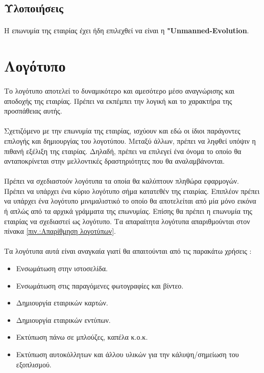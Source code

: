 \documentclass[a4paper, 12pt, twoside]{report}
\begin{document}
			
		\subsection{Υλοποιήσεις}
			\paragraph{}{Η επωνυμία της εταιρίας έχει ήδη επιλεχθεί να είναι η \textbf{"Unmanned-Evolution}.
			}
			
		
		\section{Λογότυπο}
			\paragraph{}{Το λογότυπο αποτελεί το δυναμικότερο και αμεσότερο μέσο αναγνώρισης και αποδοχής της εταιρίας. Πρέπει να εκπέμπει την λογική και το χαρακτήρα της προσπάθειας αυτής.
			}
			\paragraph{}{Σχετιζόμενο με την επωνυμία της εταιρίας, ισχύουν και εδώ οι ίδιοι παράγοντες επιλογής και δημιουργίας του λογοτύπου. Μεταξύ άλλων, πρέπει να ληφθεί υπόψιν η πιθανή εξέλιξη της εταιρίας. Δηλαδή, πρέπει να επιλεγεί ένα όνομα το οποίο θα ανταποκρίνεται στην μελλοντικές δραστηριότητες που θα αναλαμβάνονται.
			}
			\paragraph{}{Πρέπει να σχεδιαστούν λογότυπα τα οποία θα καλύπτουν πληθώρα εφαρμογών. Πρέπει να υπάρχει ένα κύριο λογότυπο σήμα κατατεθέν της εταιρίας. Επιπλέον πρέπει να υπάρχει ένα λογότυπο μινιμαλιστικό το οποίο θα αποτελείται από μία μόνο εικόνα ή απλώς από τα αρχικά γράμματα της επωνυμίας. Επίσης θα πρέπει η επωνυμία της εταιρίας να σχεδιαστεί ως λογότυπο. Τα απαραίτητα λογότυπα απαριθμούνται στον πίνακα \ref{πιν.:Απαρίθμηση λογοτύπων}.
			}
			\paragraph{}{Τα λογότυπα αυτά είναι αναγκαία γιατί θα απαιτούνται από τις παρακάτω χρήσεις :
			\begin{itemize}
				\item Ενσωμάτωση στην ιστοσελίδα.
				\item Ενσωμάτωση στις παραγόμενες φωτογραφίες και βίντεο.
				\item Δημιουργία εταιρικών καρτών.
				\item Δημιουργία εταιρικών εντύπων.
				\item Εκτύπωση πάνω σε μπλούζες, καπέλα κ.ο.κ.
				\item Εκτύπωση αυτοκόλλητων και άλλου υλικών για την κάλυψη/σημείωση του εξοπλισμού.
			\end{itemize}
			}
\end{document}
